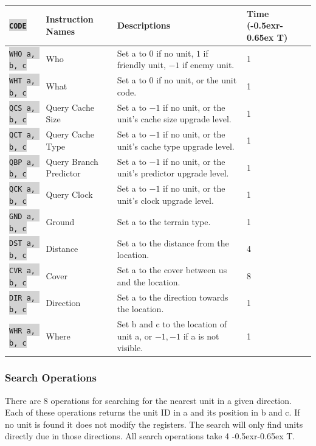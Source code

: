 \documentclass{article}
\newcommand{\vnscode}[1]{\colorbox{lightgray}{\lstinline[language=vns]{#1}}}
\newcommand{\RT}{\lower-0.5ex\hbox{r}\kern-0.65ex T}
\begin{document}
\begin{minipage}{\textwidth}
\label{table:query}
\centering
\begin{tabular}{llll}
    \hline \vnscode{CODE} & Instruction Names & Descriptions & Time (\RT) \\ \hline
    \vnscode{WHO a, b, c} & Who & Set a to $0$ if no unit, $1$ if friendly unit, $-1$ if enemy unit. & 1 \\
    \vnscode{WHT a, b, c} & What & Set a to $0$ if no unit, or the unit code. & 1 \\
    \vnscode{QCS a, b, c} & Query Cache Size & Set a to $-1$ if no unit, or the unit's cache size upgrade level. & 1 \\
    \vnscode{QCT a, b, c} & Query Cache Type & Set a to $-1$ if no unit, or the unit's cache type upgrade level. & 1 \\
    \vnscode{QBP a, b, c} & Query Branch Predictor & Set a to $-1$ if no unit, or the unit's predictor upgrade level. & 1 \\
    \vnscode{QCK a, b, c} & Query Clock & Set a to $-1$ if no unit, or the unit's clock upgrade level. & 1 \\
    \vnscode{GND a, b, c} & Ground & Set a to the terrain type. & 1 \\
    \vnscode{DST a, b, c} & Distance & Set a to the distance from the location. & 4 \\
    \vnscode{CVR a, b, c} & Cover & Set a to the cover between us and the location. & 8 \\
    \vnscode{DIR a, b, c} & Direction & Set a to the direction towards the location. & 1 \\
    \vnscode{WHR a, b, c} & Where & Set b and c to the location of unit a, or $-1,-1$ if a is not visible. & 1 \\
\end{tabular}
\end{minipage}

\subsubsection{Search Operations}

There are 8 operations for searching for the nearest unit in a given direction.
Each of these operations returns the unit ID in a and its position in b and c.
If no unit is found it does not modify the registers. The search will only find
units directly due in those directions. All search operations take 4 \RT.
\end{document}
